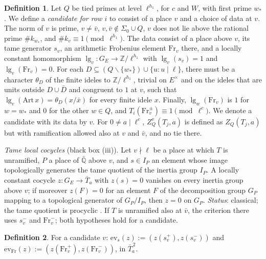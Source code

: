 \documentclass[reqno]{amsart}
\theoremstyle{definition}
\newtheorem{definition}{Definition}[section]
\theoremstyle{plain}
\newcommand{\Z}{\mathbb{Z}}
\newcommand{\Q}{\mathbb{Q}}
\newcommand{\Fr}{\mathrm{Fr}}
\newcommand{\ev}{\mathrm{ev}}
\begin{document}
\begin{definition}\label{def:candidate}
Let \(Q\) be tied primes at level \(\ell^{h_1}\), for \(c\) and \(W\), with first prime \(w_*\).  We define a \emph{candidate for row \(i\)} to consist of a place \(v\) and a choice of data at \(v\).  The norm of \(v\) is prime, \(v\ne\bar v\), \(v,\bar v\notin\Sigma_0\cup Q\), \(v\) does not lie above the rational prime \(\#k_{w_*}\), and \(\#k_v\equiv1\pmod{\ell^{h_1}}\).  The data consist of a place above \(v\), its tame generator \(s_v\), an arithmetic Frobenius element \(\Fr_v\) there, and a locally constant homomorphism \(\lg_v\colon G_E\to\Z/\ell^{h_1}\) with \(\lg_v(s_v)=1\) and \(\lg_v(\Fr_v)=0\).  For each \(D\subseteq(Q\smallsetminus\{w_*\})\cup\{u:u\mid\ell\}\), there must be a character \(\theta_D\) of the finite ideles to \(\Z/\ell^{h_1}\), trivial on \(E^\times\) and on the ideles that are units outside \(D\cup\bar D\) and congruent to \(1\) at \(v\), such that \(\lg_v(\mathrm{Art}\,x)=\theta_D(x/\bar x)\) for every finite idele \(x\).  Finally, \(\lg_w(\Fr_v)\) is \(1\) for \(w=w_*\) and \(0\) for the other \(w\in Q\), and \(T_i(\Fr_v^{\pm})\equiv1\pmod{\ell^c}\).  We denote a candidate with its data by \(v\).  For \(0 \ne a \mid \ell^c\), \(Z^v_Q(T_j, a)\) is defined as \(Z_Q(T_j, a)\) but with ramification allowed also at \(v\) and \(\bar v\), and no tie there.
\end{definition}

\emph{Tame local cocycles} (black box (iii)).  Let \(v \nmid \ell\) be a place at which \(T\) is unramified, \(P\) a place of \(\bar{\Q}\) above \(v\), and \(s \in I_P\) an element whose image topologically generates the tame quotient of the inertia group \(I_P\).  A locally constant cocycle \(z \colon G_E \to \bar T_a\) with \(z(s) = 0\) vanishes on every inertia group above \(v\); if moreover \(z(F) = 0\) for an element \(F\) of the decomposition group \(G_P\) mapping to a topological generator of \(G_P/I_P\), then \(z = 0\) on \(G_P\).  \emph{Status}: classical; the tame quotient is procyclic \cite[Ch.~IV, \S2]{SLF}.  If \(T\) is unramified also at \(\bar v\), the criterion there uses \(s_v^{-}\) and \(\Fr_v^{-}\); both hypotheses hold for a candidate.

\begin{definition}\label{def:evaluations}
For a candidate \(v\): \(\ev_s(z) := (z(s_v^{+}), z(s_v^{-}))\) and \(\ev_{\Fr}(z) := (z(\Fr_v^{+}), z(\Fr_v^{-}))\), in \(\bar T_a^{\,2}\).
\end{definition}
\end{document}
